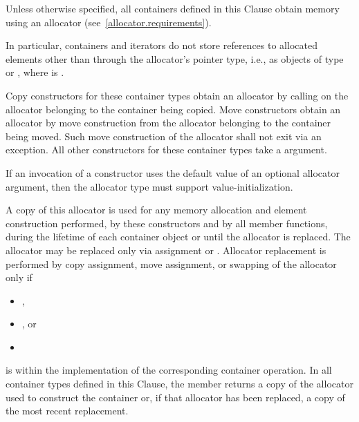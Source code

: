 \pnum
Unless otherwise specified, all containers defined in this Clause obtain memory
using an allocator (see~\ref{allocator.requirements}).
\begin{note}
In particular, containers and iterators do not store references
to allocated elements other than through the allocator's pointer type,
i.e., as objects of type  or
,
where  is .
\end{note}
Copy constructors for these container types obtain an allocator by calling
on the allocator belonging to the container being copied.
Move constructors obtain an allocator by move construction from the allocator belonging to
the container being moved. Such move construction of the allocator shall not exit via an
exception.
All other constructors for these container types take a
 argument.
\begin{note}
If an invocation of a constructor uses the default value of an optional
allocator argument, then the allocator type must support value-initialization.
\end{note}
A copy of this allocator is used for any memory allocation and element construction
performed, by these constructors and by all member functions,
during the lifetime of each container object
or until the allocator is replaced. The allocator may be replaced only via assignment or
. Allocator replacement is performed by
copy assignment, move assignment, or swapping of the allocator only if
\begin{itemize}
\item {},
\item {},
or
\item {}
\end{itemize}
is 
within the implementation of the corresponding container operation.
In all container types defined in this Clause, the member 
returns a copy of the allocator used to construct the container or, if that allocator
has been replaced, a copy of the most recent replacement.

